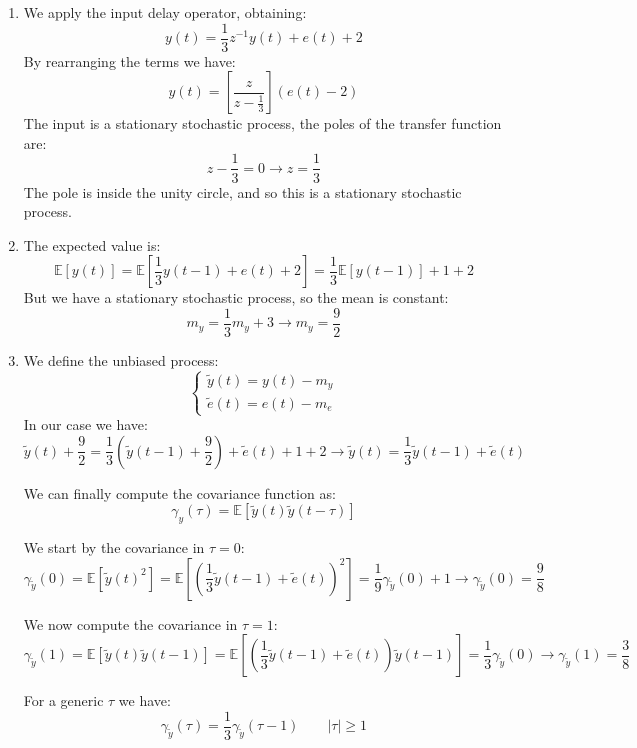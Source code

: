 \begin{enumerate}
    \item We apply the input delay operator, obtaining: 
        \[y(t)=\dfrac{1}{3}z^{-1}y(t)+e(t)+2\]
        By rearranging the terms we have: 
        \[y(t)=\left[\dfrac{z}{z-\frac{1}{3}}\right]\left(e(t)-2\right)\]
        The input is a stationary stochastic process, the poles of the transfer function are: 
        \[z-\frac{1}{3}=0\rightarrow z=\frac{1}{3}\]
        The pole is inside the unity circle, and so this is a stationary stochastic process. 
    \item The expected value is: 
        \[\mathbb{E}\left[y(t)\right]=\mathbb{E}\left[\dfrac{1}{3}y(t-1)+e(t)+2\right]=\dfrac{1}{3}\mathbb{E}\left[y(t-1)\right]+1+2\]
        But we have a stationary stochastic process, so the mean is constant: 
        \[m_y=\dfrac{1}{3}m_y+3\rightarrow m_y=\dfrac{9}{2}\]
    \item We define the unbiased process: 
        \[\begin{cases}
            \tilde{y}(t)=y(t)-m_y \\
            \tilde{e}(t)=e(t)-m_e
        \end{cases}\]
        In our case we have: 
        \[\tilde{y}(t)+\dfrac{9}{2}=\dfrac{1}{3}\left(\tilde{y}(t-1)+\dfrac{9}{2}\right)+\tilde{e}(t)+1+2\rightarrow\tilde{y}(t)=\dfrac{1}{3}\tilde{y}(t-1)+\tilde{e}(t)\]

        We can finally compute the covariance function as: 
        \[\gamma_y(\tau)=\mathbb{E}\left[\tilde{y}(t)\tilde{y}(t-\tau)\right]\]

        We start by the covariance in $\tau=0$: 
        \[\gamma_{\tilde{y}}(0)=\mathbb{E}\left[\tilde{y}(t)^2\right]=\mathbb{E}\left[ \left(\dfrac{1}{3}\tilde{y}(t-1)+\tilde{e}(t)\right)^2\right]=\dfrac{1}{9}\gamma_{\tilde{y}}(0) + 1\rightarrow \gamma_{\tilde{y}}(0)=\dfrac{9}{8}\]
        
        We now compute the covariance in $\tau=1$: 
        \[\gamma_{\tilde{y}}(1)=\mathbb{E}\left[ \tilde{y}(t)\tilde{y}(t-1)\right]=\mathbb{E}\left[ \left(\dfrac{1}{3}\tilde{y}(t-1)+\tilde{e}(t)\right)\tilde{y}(t-1)\right]=\dfrac{1}{3}\gamma_{\tilde{y}}(0)\rightarrow \gamma_{\tilde{y}}(1)=\dfrac{3}{8}\]

        For a generic $\tau$ we have: 
        \[\gamma_{\tilde{y}}(\tau)=\dfrac{1}{3}\gamma_{\tilde{y}}(\tau-1) \qquad \left\lvert \tau \right\rvert \geq 1\]
\end{enumerate}
